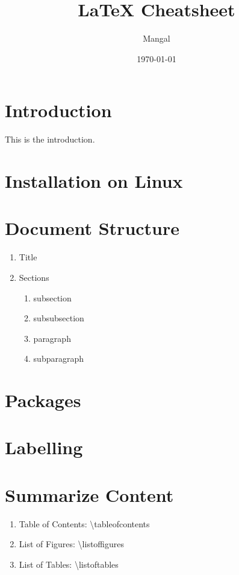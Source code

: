 \documentclass[a4paper,12pt]{article}
\begin{document}
\title{LaTeX Cheatsheet}
\author{Mangal}
\date{\today}
\maketitle
{}
\tableofcontents
\newpage
\listoffigures
\newpage
\listoftables
\newpage
{}

\section{Introduction}
This is the introduction.

\section{Installation on Linux}

\section{Document Structure}
\begin{enumerate}
\item Title
\item Sections
\begin{enumerate}
\item subsection
\item subsubsection
\item paragraph
\item subparagraph
\end{enumerate}
\end{enumerate}

\section{Packages}

\section{Labelling}

\section{Summarize Content}

\begin{enumerate}
\item Table of Contents: \textbackslash tableofcontents
\item List of Figures: \textbackslash listoffigures
\item List of Tables: \textbackslash listoftables
\end{enumerate}
\end{document}
